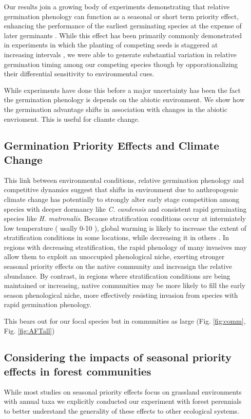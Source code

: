 \documentclass{article}\usepackage[]{graphicx}\usepackage[]{color}
\begin{document}
Our results join a growing body of experiments demonstrating that relative germination phenology can function as a seasonal or short term priority effect, enhancing the performance of the earliest germinating species at the expense of later germinants \citep{}. While this effect has been primarily commonly demonstrated in experiments in which the planting of competing seeds is staggered at increasing intervals \citep{}, we were able to generate substantial variation in relative germination timing among our competing species though by opporationalizing their differential sensitivity to environmental cues. 

While experiments have done this before a major uncertainty has been the fact the germination phenology is depends on the abiotic environment. We show how the germination advantage shifts in association with changes in the abiotic envrioment. This is useful for cliamte change.

\subsection{Germination Priority Effects and Climate Change}

This link between environmental conditions, relative germination phenology and competitive dynamics suggest that shifts in environment due to anthropogenic climate change has potentially to strongly alter early stage competition among species with deeper dormancy like \textit{C. candensis} and consistent rapid germinating species like \textit{H. matronalis}. Because stratification conditions occur at intermiately low temperature ( usally 0-10  \degreeC \citep{}), global warming is likely to increase the extent of stratification conditions in some locations, while decreasing it in others \citep{}. In regions with decreasing stratification, the rapid phenology of many invasives may allow them to exploit an unoccupied phenological niche, exerting stronger seasonal priority effects on the native community and increasign the relative abundance. By contrast, in regions where stratification conditions are being maintained or increasing, native communities may be more likely to fill the early season phenological niche, more effectively resisting invasion from species with rapid germination phenology.

This bears out for our focal species but in communities as large (Fig. \ref{fig:comm}, Fig. \ref{fig:AFTall})

\subsection*{Considering the impacts of seasonal priority effects in forest communities}
While most studies on seasonal priority effects focus on grassland environments with annual taxa \citep{} we explicitly conducted our experiment with forest perennials to better understand the generality of these effects to other ecological systems. 
\end{document}
